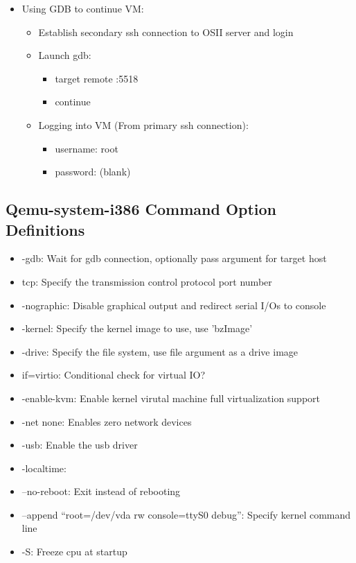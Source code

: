 \documentclass[a4paper]{article}
\begin{document}
\begin{itemize}
    \item Using GDB to continue VM:
    \begin{itemize}
      \item Establish secondary ssh connection to OSII server and login
        \item Launch gdb:
        \begin{itemize}
          \item target remote :5518
            \item continue
        \end{itemize}
    \item Logging into VM (From primary ssh connection):
    \begin{itemize}
      \item username: root
        \item password: (blank)
    \end{itemize}
    \end{itemize}
\end{itemize}


\subsection{Qemu-system-i386 Command Option Definitions}
\begin{itemize}
  \item -gdb: Wait for gdb connection, optionally pass argument for target host
    \item tcp: Specify the transmission control protocol port number
    \item -nographic: Disable graphical output and redirect serial I/Os to console
    \item -kernel: Specify the kernel image to use, use 'bzImage'
    \item -drive: Specify the file system, use file argument as a drive image
    \item if=virtio: Conditional check for virtual IO?
    \item -enable-kvm: Enable kernel virutal machine full virtualization support
    \item -net none: Enables zero network devices
    \item -usb: Enable the usb driver
    \item -localtime: 
    \item --no-reboot: Exit instead of rebooting
    \item --append ``root=/dev/vda rw console=ttyS0 debug'': Specify kernel command line
    \item -S: Freeze cpu at startup
\end{itemize}
\end{document}
